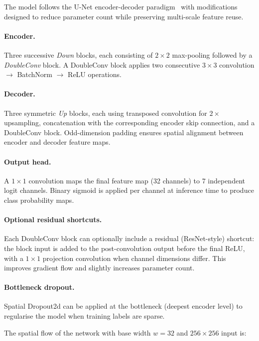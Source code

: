 \documentclass{aa}
\begin{document}
The model follows the U-Net encoder-decoder paradigm~\cite{ronneberger2015unet} with modifications designed to reduce parameter count while preserving multi-scale feature reuse.

\paragraph{Encoder.}
Three successive \textit{Down} blocks, each consisting of $2\times 2$ max-pooling followed by a \textit{DoubleConv} block. A DoubleConv block applies two consecutive $3\times 3$ convolution $\to$ BatchNorm $\to$ ReLU operations.

\paragraph{Decoder.}
Three symmetric \textit{Up} blocks, each using transposed convolution for $2\times$ upsampling, concatenation with the corresponding encoder skip connection, and a DoubleConv block. Odd-dimension padding ensures spatial alignment between encoder and decoder feature maps.

\paragraph{Output head.}
A $1\times 1$ convolution maps the final feature map (32 channels) to 7 independent logit channels. Binary sigmoid is applied per channel at inference time to produce class probability maps.

\paragraph{Optional residual shortcuts.}
Each DoubleConv block can optionally include a residual (ResNet-style) shortcut: the block input is added to the post-convolution output before the final ReLU, with a $1\times 1$ projection convolution when channel dimensions differ. This improves gradient flow and slightly increases parameter count.

\paragraph{Bottleneck dropout.}
Spatial Dropout2d can be applied at the bottleneck (deepest encoder level) to regularise the model when training labels are sparse.

The spatial flow of the network with base width $w=32$ and $256\times 256$ input is:
\end{document}
